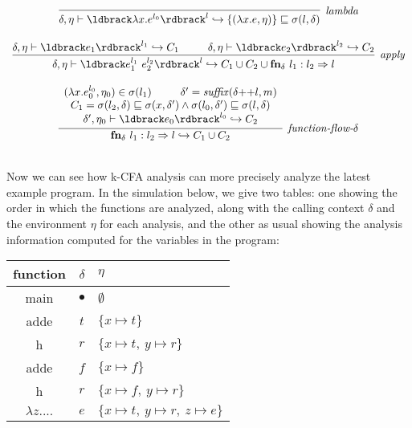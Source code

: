 \documentclass[11pt]{article}
\begin{document}
\[
\begin{array}{c}
\infer[\textit{lambda}]
	{\delta, \eta \vdash \parg{\lambda x . e^{l_0}}^l \hookrightarrow \{(\lambda x . e, \eta)\} \alap \sigma(l, \delta)}
	{}\\[3ex]
	
\infer[\textit{apply}]
	{\delta, \eta \vdash \parg{e_1^{l_1} ~ e_2^{l_2}}^l \hookrightarrow C_1 \cup C_2
    \cup \textbf{fn}_\delta~l_1: l_2 \Rightarrow l}
	{
		\delta, \eta \vdash \parg{e_1}^{l_1} \hookrightarrow C_1 ~~~~~~~~ \delta, \eta \vdash \parg{e_2}^{l_2} \hookrightarrow C_2
	}\\[3ex]
		
\infer[\textit{function-flow-$\delta$}]
	{\textbf{fn}_\delta~l_1: l_2 \Rightarrow l \hookrightarrow C_1 \cup C_2}
	{\begin{array}{c}
        (\lambda x . e_0^{l_0}, \eta_0) \in \sigma(l_1) ~~~~~~~~ \delta' = \mathit{suffix}(\delta {+}{+} l, m) \\
        C_1 = \sigma(l_2,\delta) \alap \sigma(x,\delta') \land \sigma(l_0,\delta') \alap \sigma(l,\delta) \\
        \delta', \eta_0 \vdash \parg{e_0}^{l_0} \hookrightarrow C_2 \\
    \end{array}
    }\\[3ex]

\end{array}
\]

Now we can see how k-CFA analysis can more precisely analyze the latest example program.  In the simulation below, we give two tables: one showing the order in which the functions are analyzed, along with the calling context $\delta$ and the environment $\eta$ for each analysis, and the other as usual showing the analysis information computed for the variables in the program:




\tablespace
\begin{tabular}{c | c | l}

\textsf{function} & $\delta$ & $\eta$ \\
\hline
main & $\bullet$ & $\emptyset$ \\
adde & $t$       & $\{x \mapsto t\}$ \\
h    & $r$       & $\{x \mapsto t,~ y \mapsto r\}$ \\
adde & $f$       & $\{x \mapsto f\}$ \\
h    & $r$       & $\{x \mapsto f,~ y \mapsto r\}$ \\
$\lambda z ....$ & $e$ & $\{x \mapsto t,~ y \mapsto r,~ z \mapsto e\}$ \\

\end{tabular}
\tablespace
\end{document}
